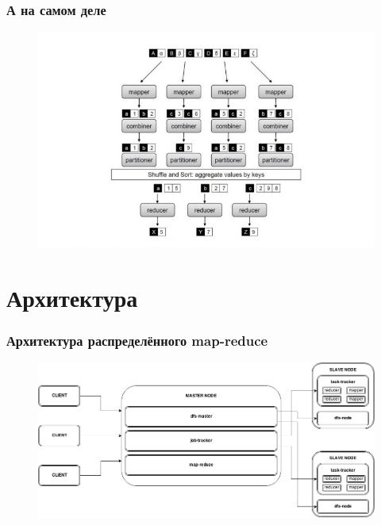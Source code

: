 \documentclass{beamer}
\begin{document}
    \begin{frame}
    \frametitle{А на самом деле}
        \begin{figure}[h!]
            \includegraphics[scale=0.4]{mapreduce.jpg}
        \end{figure}
    \end{frame}
    

\section{Архитектура}
    \begin{frame}
    \frametitle{Архитектура распределённого map-reduce}
        \begin{figure}[h!]
            \includegraphics[scale=0.3]{map-reduce.png}
        \end{figure}
        
    \end{frame}
\end{document}
